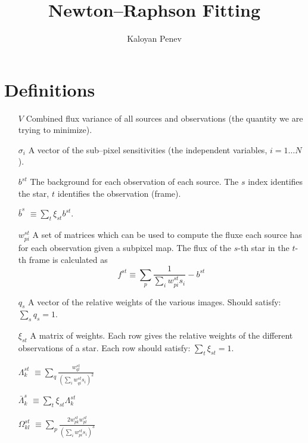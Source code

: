 \documentclass{article}
\author{Kaloyan Penev}
\title{Newton--Raphson Fitting}
\begin{document}
\maketitle
\section{Definitions}
\begin{itemize}
	\item[$V$] Combined flux variance of all sources and observations
		(the quantity we are trying to minimize).
	\item[$\sigma_i$] A vector of the sub--pixel sensitivities (the
		independent variables, $i = 1\ldots N$).
	\item[$b^{st}$] The background for each observation of each source.
		The $s$ index identifies the star, $t$ identifies the
		observation (frame).
	\item[$\bar{b}^s$] $\equiv \sum_t \xi_{st} b^{st}$.
	\item[$w_{pi}^{st}$] A set of matrices which can be used to compute
		the fluxe each source has for each observation given a
		subpixel map. The flux of the $s$-th
		star in the $t$-th frame is calculated as
		\begin{displaymath}
			f^{st}\equiv\sum_p \frac{1}{\sum_i w_{pi}^{st} s_i} -
			b^{st}
		\end{displaymath}
	\item[$q_s$] A vector of the relative weights of the various images.
		Should satisfy: $\sum_s q_s=1$.
	\item[$\xi_{st}$] A matrix of weights. Each row gives the relative
		weights of the different observations of a star. Each row
		should satisfy: $\sum_t \xi_{st}=1$.
	\item[$\Lambda_k^{st}$] $\equiv\sum_q \frac{w_{ql}^{st}}{
		\left(\sum_i w_{qi}^{st} s_i\right)^2}$
	\item[$\bar{\Lambda}_k^s$] $\equiv\sum_t \xi_{st} \Lambda_k^{st}$
	\item[$\Omega_{kl}^{st}$] $\equiv \sum_p \frac{2w_{pk}^{st} w_{pl}^{st}}
		{\left(\sum_i w_{pi}^{st}s_i\right)^3}$
\end{itemize}
\end{document}
